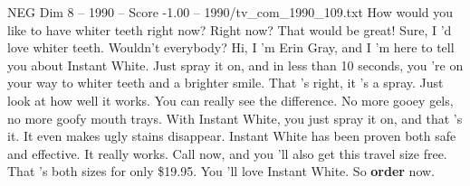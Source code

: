 \begin{textsample}{NEG Dim 8 – 1990 – Score -1.00 – 1990/tv\_com\_1990\_109.txt}  \label{ex:f8_neg_024}
How would you like to have whiter teeth right now?
Right now?
That would be great!
Sure, I 'd love whiter teeth.
Wouldn't everybody?
Hi, I 'm Erin Gray, and I 'm here to tell you about Instant White.
Just spray it on, and in less than 10 seconds, you 're on your way to whiter teeth and a brighter smile.
That 's right, it 's a spray.
Just look at how well it works.
You can really see the difference.
No more gooey gels, no more goofy mouth trays.
With Instant White, you just spray it on, and that 's it.
It even makes ugly stains disappear.
Instant White has been proven both safe and effective.
It really works.
Call now, and you 'll also get this travel size free.
That 's both sizes for only \$19.95.
You 'll love Instant White.
So \textbf{order} now.

\end{textsample}
